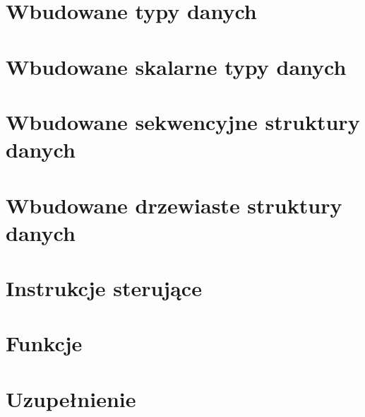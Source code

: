 
\section{Wbudowane typy danych}\label{sec:data_types}


\section{Wbudowane skalarne typy danych}\label{sec:scalar_types}


\section{Wbudowane sekwencyjne struktury danych}\label{sec:sequence_types}


\section{Wbudowane drzewiaste struktury danych}\label{sec:trees_types}


\section{Instrukcje sterujące}\label{sec:controls}


\section{Funkcje}\label{sec:funcions}


\section{Uzupełnienie}\label{sec:addons}

